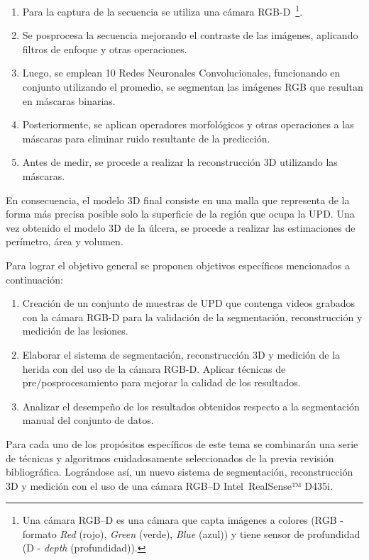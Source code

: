 \begin{enumerate}
	\item Para la captura de la secuencia se utiliza una cámara RGB-D~\footnote{Una cámara RGB–D es una cámara que capta imágenes a colores (RGB - formato \textit{Red} (rojo), \textit{Green} (verde), \textit{Blue} (azul)) y tiene sensor de profundidad (D - \textit{depth} (profundidad)).}.
	\item Se posprocesa la secuencia mejorando el contraste de las imágenes, aplicando filtros de enfoque y otras operaciones.
	\item Luego, se emplean 10 Redes Neuronales Convolucionales, funcionando en conjunto utilizando el promedio, se segmentan las imágenes RGB que resultan en máscaras binarias.
	\item Posteriormente, se aplican operadores morfológicos y otras operaciones a las máscaras para eliminar ruido resultante de la predicción.
	\item Antes de medir, se procede a realizar la reconstrucción 3D utilizando las máscaras.
\end{enumerate}


En consecuencia, el modelo 3D final consiste en una malla que representa de la forma más precisa posible solo la superficie de la región que ocupa la UPD. Una vez obtenido el modelo 3D de la úlcera, se procede a realizar las estimaciones de perímetro, área y volumen.

Para lograr el objetivo general se proponen objetivos específicos mencionados a continuación:

\begin{enumerate}
	\item Creación de un conjunto de muestras de UPD que contenga videos grabados con la cámara RGB-D para la validación de la segmentación, reconstrucción y medición de las lesiones.
	\item Elaborar el sistema de segmentación, reconstrucción 3D y medición de la herida con del uso de la cámara RGB-D. Aplicar técnicas de pre/posprocesamiento para mejorar la calidad de los resultados.
	\item Analizar el desempeño de los resultados obtenidos respecto a la segmentación manual del conjunto de datos.
\end{enumerate}

Para cada uno de los propósitos específicos de este tema se combinarán una serie de técnicas y algoritmos cuidadosamente seleccionados de la previa revisión bibliográfica. Lográndose así, un nuevo sistema de segmentación, reconstrucción 3D y medición con el uso de una cámara RGB–D Intel~\textregistered RealSense™ D435i.

